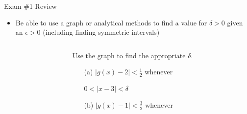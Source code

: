 \documentclass[cal1spr16Lectures.tex]{subfiles}
\begin{document}
\begin{frame}[allowframebreaks]{Exam \#1 Review}
\begin{itemize}
\begin{itemize}
	\item Be able to use a graph or analytical methods to find a value for $\delta>0$ given an $\epsilon>0$ (including finding symmetric intervals)
	\end{itemize}
\framebreak
\begin{ex}
\vspace{0.75pc}
\begin{columns}[T]
	\begin{column}{.25\textwidth}
	\end{column}
	\begin{column}{.55\textwidth}
	Use the graph to find the appropriate $\delta$.
	\begin{itemize}\footnotesize
	\item[(a)]$|g(x)-2|<\textstyle\frac{1}{2}$ whenever 
	
	\hspace{6pc}$0<|x-3|<\delta$
	\item[(b)]$|g(x)-1|<\textstyle\frac{3}{2}$ whenever 
	

\end{itemize}
\end{column}
\end{columns}
\end{ex}
\end{itemize}
\end{frame}
\end{document}
